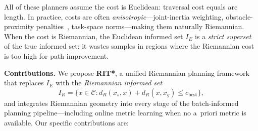 \documentclass[journal]{IEEEtran}
\newcommand{\Cspace}{\mathcal{C}}
\newcommand{\IR}{I_{\!R}}
\newcommand{\IE}{I_{\!E}}
\newcommand{\dR}{d_{\!R}}
\begin{document}
All of these planners assume the cost is Euclidean: traversal cost
equals arc length. In practice, costs are often
\emph{anisotropic}---joint-inertia weighting, obstacle-proximity
penalties~\cite{Ratliff2009,Zucker2013}, task-space norms---making them
naturally Riemannian. When the cost is Riemannian, the Euclidean informed
set $\IE$ is a \emph{strict superset} of the true informed set: it wastes
samples in regions where the Riemannian cost is too high for path
improvement.

\textbf{Contributions.}
We propose \textbf{RIT*}, a unified Riemannian planning framework
that replaces $\IE$ with the \emph{Riemannian informed set}
\begin{equation}\label{eq:IR}
  \IR = \bigl\{ x \in \Cspace : \dR(x_s, x) + \dR(x, x_g) \le c_{\mathrm{best}} \bigr\},
\end{equation}
and integrates Riemannian geometry into every stage of the
batch-informed planning pipeline---including online metric learning
when no a~priori metric is available. Our specific contributions are:
\end{document}
